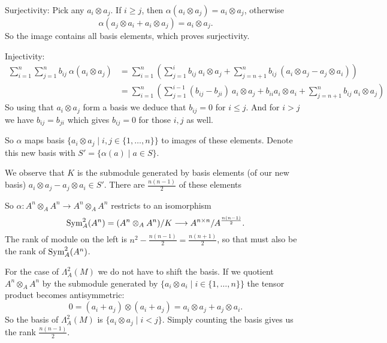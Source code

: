 \begin{exercise}{4}
\begin{enumerate}[i)]
            Surjectivity:
            Pick any $a_i \otimes a_j$. If $i \geq j$, then $\alpha(a_i \otimes
            a_j) = a_i \otimes a_j$, otherwise
            \begin{equation*}
                \alpha(a_j \otimes a_i + a_i \otimes a_j) = a_i \otimes a_j.
            \end{equation*}
            So the image contains all basis elements, which proves surjectivity.

            Injectivity:
            \begin{align*}
                \sum^n_{i=1} \sum^n_{j=1} b_{ij}\ \alpha(a_i \otimes a_j) &=
                \sum^n_{i=1} \left(\sum^i_{j=1} b_{ij}\ a_i \otimes a_j +
                \sum^n_{j=n+1} b_{ij}\ ( a_i \otimes a_j - a_j \otimes a_i
                )\right) \\
                &= \sum^n_{i=1} \left(\sum^{i - 1}_{j=1} (b_{ij} - b_{ji})\ a_i
                \otimes a_j + b_{ii} a_i \otimes a_i + \sum^n_{j=n+1} b_{ij}\
                a_i \otimes a_j \right)
            \end{align*}
            So using that $a_i \otimes a_j$ form a basis we deduce that $b_{ij}
            = 0$ for $i \leq j$. And for $i > j$ we have $b_{ij} = b_{ji}$ which
            gives $b_{ij} = 0$ for those $i, j$ as well.

            So $\alpha$ maps basis $\{ a_i \otimes a_j \mid i, j \in \{1,
            \ldots, n\}\}$ to images of these elements. Denote this new basis
            with $S' = \{ \alpha(a) \mid a \in S\}$.

            We observe that $K$ is the submodule generated by basis elements (of
            our new basis) $a_i \otimes a_j - a_j \otimes a_i \in S'$. There are
            $\frac{n (n - 1)}{2}$ of these elements

            So $\alpha \colon A^n \otimes_A A^n \rightarrow A^n \otimes_A A^n$
            restricts to an isomorphism
            \begin{equation*}
                \operatorname{Sym}^2_A(A^n) = (A^n \otimes_A A^n) / K \longrightarrow A^{n \times
                n} / A^{\frac{n (n - 1)}{2}}.
            \end{equation*}
            The rank of module on the left is $n^2 - \frac{n (n - 1)}{2} =
            \frac{n (n + 1)}{2}$, so that must also be the rank of
            $\operatorname{Sym}^2_A(A^n)$.

            For the case of $\Lambda^2_A(M)$ we do not have to shift the basis.
            If we quotient $A^n \otimes_A A^n$ by the submodule generated by
            $\{a_i \otimes a_i \mid i \in \{1, \ldots, n\}\}$ the tensor product
            becomes antisymmetric:
            \begin{equation*}
                0 = (a_i + a_j) \otimes (a_i + a_j) = a_i \otimes a_j + a_j
                  \otimes a_i.
            \end{equation*}
            So the basis of $\Lambda^2_A(M)$ is $\{ a_i \otimes a_j \mid i < j
            \}$. Simply counting the basis gives us the rank $\frac{n (n -
            1)}{2}$.




\end{enumerate}
\end{exercise}
